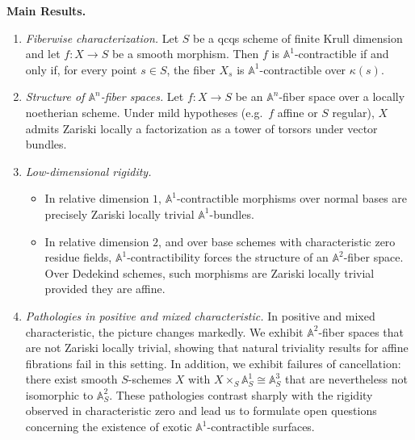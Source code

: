 \documentclass[10pt]{amsart}
\renewcommand{\AA}{\mathbb{A}}
\numberwithin{equation}{section} %
\theoremstyle{plain}
\theoremstyle{definition}
\theoremstyle{remark}
\begin{document}
\medskip

\noindent
\textbf{Main Results.}
\begin{enumerate}
\item \emph{Fiberwise characterization.}  
Let $S$ be a qcqs scheme of finite Krull dimension and let $f \colon X \to S$ be a smooth morphism. Then $f$ is $\AA^1$-contractible if and only if, for every point $s \in S$, the fiber $X_s$ is $\AA^1$-contractible over $\kappa(s)$.

\item \emph{Structure of $\AA^n$-fiber spaces.}  
Let $f \colon X \to S$ be an $\AA^n$-fiber space over a locally noetherian scheme. Under mild hypotheses (e.g.\ $f$ affine or $S$ regular), $X$ admits Zariski locally a factorization as a tower of torsors under vector bundles. 

\item \emph{Low-dimensional rigidity.}
\begin{itemize}
\item In relative dimension $1$, $\AA^1$-contractible morphisms over normal bases are precisely Zariski locally trivial $\AA^1$-bundles.
\item In relative dimension $2$, and over base schemes with characteristic zero residue fields, $\AA^1$-contractibility forces the structure of an $\AA^2$-fiber space. Over Dedekind schemes, such morphisms are Zariski locally trivial provided they are affine. 
\end{itemize}

\item \emph{Pathologies in positive and mixed characteristic.}  
In positive and mixed characteristic, the picture changes markedly. We exhibit $\AA^2$-fiber spaces that are not Zariski locally trivial, showing that natural triviality results for affine fibrations fail in this setting. In addition, we exhibit failures of cancellation: there exist smooth $S$-schemes $X$ with $X\times_S \AA^1_S \cong \AA^3_S$ that are nevertheless not isomorphic to $\AA^2_S$. These pathologies contrast sharply with the rigidity observed in characteristic zero and lead us to formulate open questions concerning the existence of exotic $\AA^1$-contractible surfaces.
\end{enumerate}

\medskip
\end{document}
